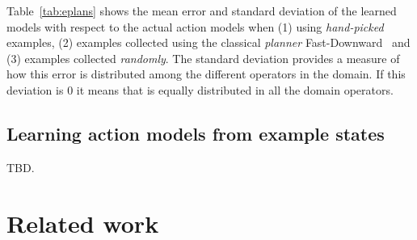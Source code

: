 \documentclass[letterpaper]{article} %
\begin{document}
Table~\ref{tab:eplans} shows the mean error and standard deviation of the learned models with respect to the actual action models when (1) using {\em hand-picked} examples, (2) examples collected using the classical {\em planner} {\sc Fast-Downward}~\cite{helmert2006fast} and (3) examples collected {\em randomly}. The standard deviation provides a measure of how this error is distributed among the different operators in the domain. If this deviation is 0 it means that is equally distributed in all the domain operators.


\subsection{Learning action models from example states}
TBD.


\section{Related work}

\end{document}
